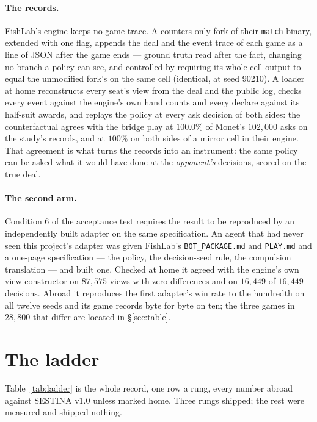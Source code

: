 \documentclass[11pt]{article}
\newcommand{\code}[1]{\texttt{#1}}
\begin{document}
\paragraph{The records.} FishLab's engine keeps no game trace. A counters-only fork of their
\code{match} binary, extended with one flag, appends the deal and the event trace of each game as a
line of JSON after the game ends --- ground truth read after the fact, changing no branch a policy
can see, and controlled by requiring its whole cell output to equal the unmodified fork's on the
same cell (identical, at seed 90210). A loader at home reconstructs every seat's view from the deal
and the public log, checks every event against the engine's own hand counts and every declare
against its half-suit awards, and replays the policy at every ask decision of both sides: the
counterfactual agrees with the bridge play at $100.0\%$ of Monet's $102{,}000$ asks on the study's
records, and at $100\%$ on both sides of a mirror cell in their engine. That agreement is what
turns the records into an instrument: the same policy can be asked what it would have done at the
\emph{opponent's} decisions, scored on the true deal.

\paragraph{The second arm.} Condition 6 of the acceptance test requires the result to be
reproduced by an independently built adapter on the same specification. An agent that had never
seen this project's adapter was given FishLab's \code{BOT\_PACKAGE.md} and \code{PLAY.md} and a
one-page specification --- the policy, the decision-seed rule, the compulsion translation --- and
built one. Checked at home it agreed with the engine's own view constructor on $87{,}575$ views with
zero differences and on $16{,}449$ of $16{,}449$ decisions. Abroad it reproduces the first adapter's
win rate to the hundredth on all twelve seeds and its game records byte for byte on ten; the three
games in $28{,}800$ that differ are located in \S\ref{sec:table}.

\section{The ladder}
\label{sec:ladder}

Table~\ref{tab:ladder} is the whole record, one row a rung, every number abroad against SESTINA
v1.0 unless marked home. Three rungs shipped; the rest were measured and shipped nothing.
\end{document}
